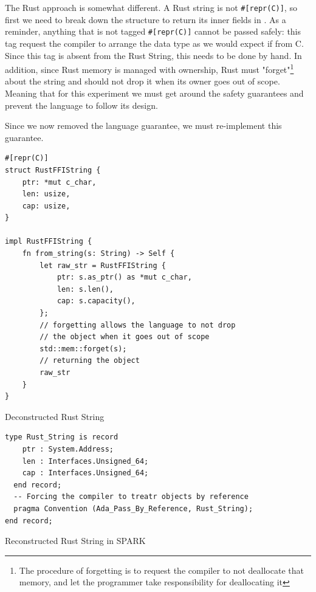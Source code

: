 \documentclass[nomenclature, english, bibtex]{kththesis}
\begin{document}
The Rust approach is somewhat different. A Rust string is not \texttt{\#[repr(C)]}, so first we need to break down the structure to return its inner fields in . As a reminder, anything that is not tagged \texttt{\#[repr(C)]} cannot be passed safely: this tag request the compiler to arrange the data type as we would expect if from C. Since this tag is absent from the Rust String, this needs to be done by hand. In addition, since Rust memory is managed with ownership, Rust must "forget"\footnote{The procedure of forgetting is to request the compiler to not deallocate that memory, and let the programmer take responsibility for deallocating it} about the string and should not drop it when its owner goes out of scope. Meaning that for this experiment we must get around the safety guarantees and prevent the language to follow its design. 

Since we now removed the language guarantee, we must re-implement this guarantee. 


\begin{listing}[!ht]
\begin{verbatim}
#[repr(C)]
struct RustFFIString {
    ptr: *mut c_char,
    len: usize,
    cap: usize,
}

impl RustFFIString {
    fn from_string(s: String) -> Self {
        let raw_str = RustFFIString {
            ptr: s.as_ptr() as *mut c_char,
            len: s.len(),
            cap: s.capacity(),
        };
        // forgetting allows the language to not drop 
        // the object when it goes out of scope
        std::mem::forget(s);
        // returning the object
        raw_str
    }
}

\end{verbatim}
\caption[Deconstructed Rust String]{Deconstructed Rust String}
\label{lst:deconstructed_rust_string}
\end{listing}
\FloatBarrier

\begin{listing}[!ht]
\begin{verbatim}
type Rust_String is record
    ptr : System.Address;
    len : Interfaces.Unsigned_64;
    cap : Interfaces.Unsigned_64;
  end record;
  -- Forcing the compiler to treatr objects by reference
  pragma Convention (Ada_Pass_By_Reference, Rust_String);
end record;
\end{verbatim}
\caption[Reconstructed Rust String]{Reconstructed Rust String in SPARK}
\label{lst:reconstructed_rust_string}
\end{listing}
\FloatBarrier
\end{document}
